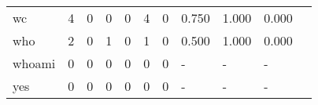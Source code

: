 \begin{longtable}{lp{1.2cm}p{1.2cm}p{1.2cm}p{1.2cm}p{1.2cm}p{1.2cm}p{1.2cm}p{1.2cm}p{1.2cm}p{1.2cm}}
wc        &                                     4 &                                                  0 &                                                  0 &                                                  0 &                                                  4 &                                                  0 &                                              0.750 &                                              1.000 &                                              0.000 \\
who       &                                     2 &                                                  0 &                                                  1 &                                                  0 &                                                  1 &                                                  0 &                                              0.500 &                                              1.000 &                                              0.000 \\
whoami    &                                     0 &                                                  0 &                                                  0 &                                                  0 &                                                  0 &                                                  0 &                                                  - &                                                  - &                                                  - \\
yes       &                                     0 &                                                  0 &                                                  0 &                                                  0 &                                                  0 &                                                  0 &                                                  - &                                                  - &                                                  - \\
\end{longtable}
